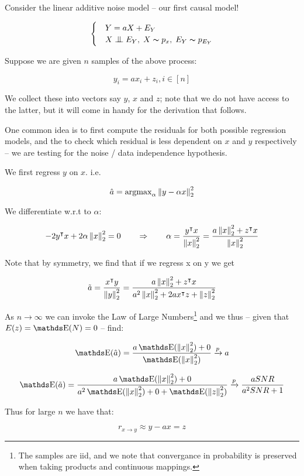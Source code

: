 Consider the linear additive noise model -- our first causal model!

\[ \begin{cases} 
    & Y = aX + E_Y  \\
    & X \bigCI E_Y,\; X \thicksim p_x,\; E_Y \thicksim p_{E_Y}  
 \end{cases}
\]

Suppose we are given $n$ samples of the above process:

$$
    y_i = ax_i + z_i, i \in \left[n\right]
$$

We collect these into vectors say $y$, $x$ and $z$; note that we do not have
access to the latter, but it will come in handy for the derivation that follows.

One common idea is to first compute the residuals for both possible regression models,
and the to check which residual is less dependent on $x$ and $y$ respectively -- we are
testing for the noise / data independence hypothesis.

We first regress $y$ on $x$. i.e.

$$
    \hat{a} = \operatorname{argmax}_{\alpha} \left\lVert y - \alpha x\right\rVert_{2}^2
$$

We differentiate w.r.t to $\alpha$:

$$
    -2y^\intercal x + 2\alpha \left\lVert x\right\rVert_2^2 = 0 \qquad \Rightarrow \qquad 
    \alpha = \frac{y^\intercal x}{\left\lVert x\right\rVert_2^2} = 
    \frac{a\left\lVert x\right\rVert_2^2 + z^\intercal x}{\left\lVert x\right\rVert_2^2}
$$

Note that by symmetry, we find that if we regress x on y we get

$$
    \tilde{a} = \frac{x^\intercal y}{\left\lVert y\right\rVert_2^2} = 
    \frac{a\left\lVert x\right\rVert_2^2 + z^\intercal x}{a^2 \left\lVert x\right\rVert_2^2 + 2a x^\intercal z + \left\lVert z\right\rVert^2_2}
$$

As $n \rightarrow \infty$ we can invoke the Law of Large Numbers\footnote{The samples are iid, 
and we note that convergance in probability is preserved when taking products and 
continuous mappings.} and we thus -- given that $E(z) = \E(N) = 0$ -- find:

$$
    \E(\hat{a}) = \frac{a\E(\norm{x}_2^2) + 0}{\E(\norm{x}_2^2)} \xrightarrow{p} a 
$$

$$
    \E(\tilde{a}) = \frac{a\E(\norm{x}_2^2) + 0}{
        a^2 \E(\norm{x}_2^2) + 0 + \E(\norm{z}^2_2)} \xrightarrow{p}
        \frac{a SNR}{a^2 SNR + 1}
$$

Thus for large $n$ we have that:

$$
    r_{x \rightarrow y} \approx y - ax = z
$$

